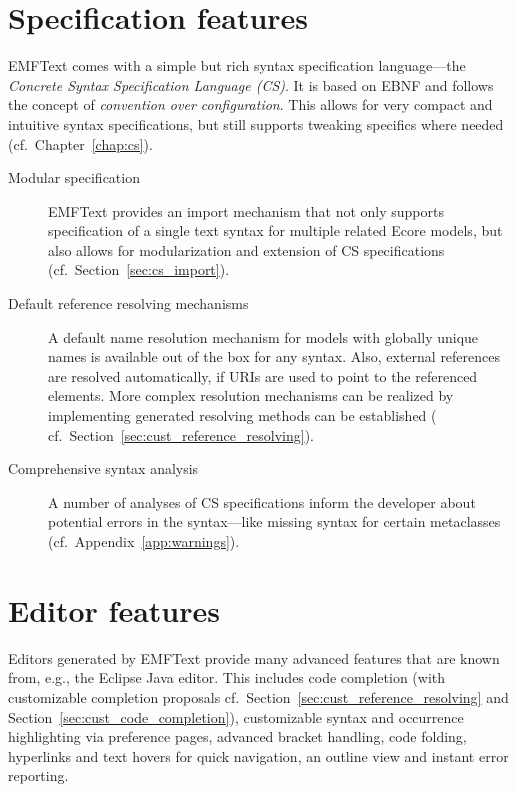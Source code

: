 \section{Specification features}

EMFText comes with a simple but rich syntax specification language---the
\emph{Concrete Syntax Specification Language (CS)}. It is based on EBNF 
and follows the concept of \emph{convention over configuration}. This 
allows for very compact and intuitive syntax specifications, but still 
supports tweaking specifics where needed (cf.~Chapter~\ref{chap:cs}).

\begin{description}

  \item[Modular specification]
        EMFText provides an import mechanism that not only supports specification 
        of a single text syntax for multiple related Ecore models, but also allows 
        for modularization and extension of CS specifications (cf.~Section~\ref{sec:cs_import}).

  \item[Default reference resolving mechanisms]
        A default name resolution mechanism for models with globally unique 
        names is available out of the box for any syntax. Also, external
        references are resolved automatically, if URIs are used to point to the
        referenced elements. More complex resolution mechanisms can be realized
        by implementing generated resolving methods can be established (
        cf.~Section~\ref{sec:cust_reference_resolving}).

  \item[Comprehensive syntax analysis]
        A number of analyses of CS specifications inform the developer about 
        potential errors in the syntax---like missing syntax for certain 
        metaclasses (cf.~Appendix~\ref{app:warnings}).

\end{description}


\section{Editor features}

Editors generated by EMFText provide many advanced features that are known from,
e.g., the Eclipse Java editor. This includes code completion (with customizable 
completion proposals cf.~Section~\ref{sec:cust_reference_resolving} 
and Section~\ref{sec:cust_code_completion}), customizable syntax and occurrence 
highlighting via preference pages, advanced bracket handling, code folding, 
hyperlinks and text hovers for quick navigation, an outline view and instant error reporting.


